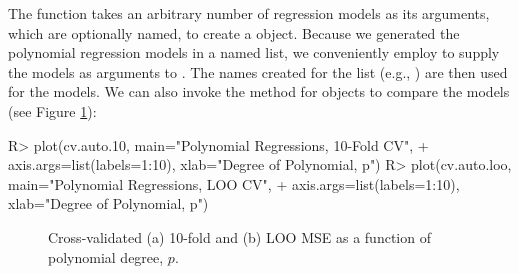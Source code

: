 \documentclass[
]{jss}
\begin{document}
The  function takes an arbitrary number of regression
models as its arguments, which are optionally named, to create a
 object. Because we generated the polynomial regression
models in a named list, we conveniently employ  to
supply the models as arguments to . The names created for
the list (e.g., ) are then used for the models. We can also
invoke the  method for  objects to
compare the models (see Figure
\ref{fig:polynomial-regression-CV-graph-2}):

\begin{CodeChunk}
\begin{CodeInput}
R> plot(cv.auto.10, main="Polynomial Regressions, 10-Fold CV",
+      axis.args=list(labels=1:10), xlab="Degree of Polynomial, p")
R> plot(cv.auto.loo, main="Polynomial Regressions, LOO CV",
+      axis.args=list(labels=1:10), xlab="Degree of Polynomial, p")
\end{CodeInput}
\begin{figure}

{\centering {}

}

\caption[Cross-validated (a) 10-fold and (b) LOO MSE as a function of polynomial degree, $p$]{Cross-validated (a) 10-fold and (b) LOO MSE as a function of polynomial degree, $p$.}\label{fig:polynomial-regression-CV-graph-2}
\end{figure}
\end{CodeChunk}
\end{document}
